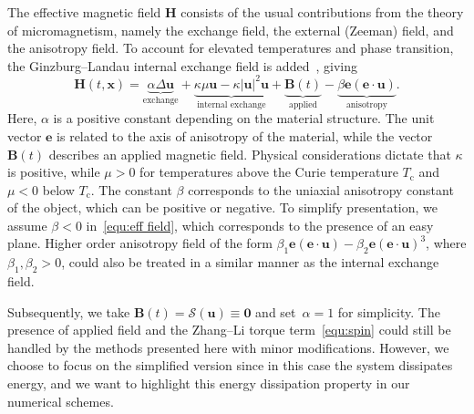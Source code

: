 \documentclass[11pt, reqno]{amsart}
\theoremstyle{definition}
\theoremstyle{remark}
\numberwithin{equation}{section}
\newcommand{\bff}{\boldsymbol}
\begin{document}
The effective magnetic field $\bff{H}$ consists of the usual contributions from the theory of micromagnetism, namely the exchange field, the external (Zeeman) field, and the anisotropy field. To account for elevated temperatures and phase transition, the Ginzburg--Landau internal exchange field is added~\cite{BarBar98, Gar97}, giving
\begin{equation}\label{equ:eff field}
	\bff{H}(t,\bff{x}) 
	= \underbrace{\alpha \Delta \bff{u}}_{\text{exchange}} + \underbrace{\kappa \mu \bff{u}- \kappa |\bff{u}|^2 \bff{u}}_{\text{internal exchange}} + \underbrace{\bff{B}(t)}_{\text{applied}}
	- \underbrace{\beta \bff{e}(\bff{e}\cdot \bff{u})}_{\text{anisotropy}}.
\end{equation}
Here, $\alpha$ is a positive constant depending on the material structure. The unit vector $\bff{e}$ is related to the axis of anisotropy of the material, while the vector $\bff{B}(t)$ describes an applied magnetic field. Physical considerations dictate that $\kappa$ is positive, while $\mu>0$ for temperatures above the Curie temperature $T_\mathrm{c}$ and $\mu<0$ below $T_\mathrm{c}$. The constant $\beta$ corresponds to the uniaxial anisotropy constant of the object, which can be positive or negative. To simplify presentation, we assume $\beta<0$ in~\eqref{equ:eff field}, which corresponds to the presence of an easy plane. Higher order anisotropy field of the form $\beta_1 \bff{e}(\bff{e}\cdot\bff{u})- \beta_2 \bff{e}(\bff{e}\cdot \bff{u})^3$, where $\beta_1,\beta_2>0$, could also be treated in a similar manner as the internal exchange field.

Subsequently, we take $\bff{B}(t)=\mathcal{S}(\bff{u})\equiv \bff{0}$ and set~$\alpha=1$ for simplicity. The presence of applied field and the Zhang--Li torque term~\eqref{equ:spin} could still be handled by the methods presented here with minor modifications. However, we choose to focus on the simplified version since in this case the system dissipates energy, and we want to highlight this energy dissipation property in our numerical schemes. 

\par \medskip
\end{document}
